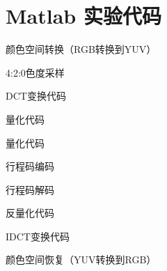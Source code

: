 \chapter{Matlab 实验代码}

颜色空间转换（RGB转换到YUV）


4:2:0色度采样


DCT变换代码


量化代码


量化代码


行程码编码


行程码解码


反量化代码


IDCT变换代码


颜色空间恢复（YUV转换到RGB）
